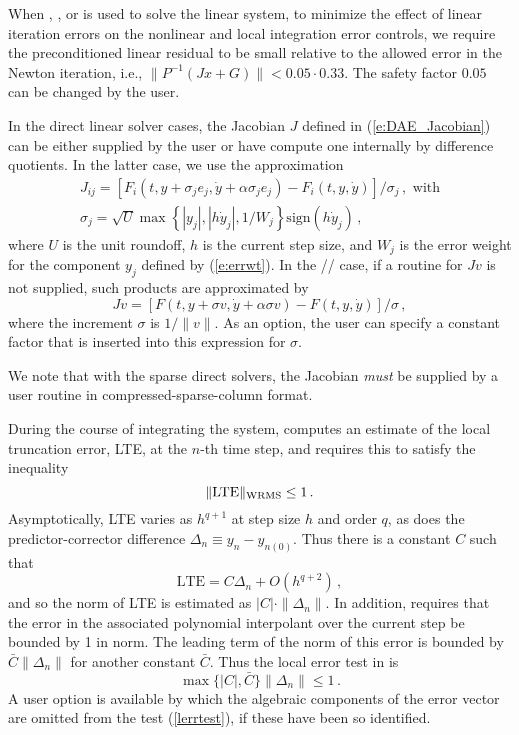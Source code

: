 When {\spgmr}, {\spbcg}, or {\sptfqmr} is used to solve the linear system, to
minimize the effect of linear iteration errors on the nonlinear and local integration
error controls, we require the preconditioned linear residual to be small relative to
the allowed error in the Newton iteration, i.e., 
$\| P^{-1}(Jx+G) \| < 0.05 \cdot 0.33$.
The safety factor $0.05$ can be changed by the user.

In the direct linear solver 
cases, the Jacobian $J$ defined in (\ref{e:DAE_Jacobian}) 
can be either supplied by the user or have {\idas} compute one internally 
by difference quotients. In the latter case, we use the approximation
\begin{gather*}
  J_{ij} = [F_i(t,y+\sigma_j e_j, \dot y + \alpha\sigma_j e_j) - 
            F_i(t,y, \dot y)]/\sigma_j \, , \text{ with}\\
  \sigma_j = \sqrt{U} \max \left\{ |y_j|, |h \dot y_j|,1/W_j \right\}
             \mbox{sign}(h \dot y_j) \, ,
\end{gather*}
where $U$ is the unit roundoff, $h$ is the current step size, and $W_j$ is 
the error weight for the component $y_j$ defined by (\ref{e:errwt}).
In the {\spgmr}/{\spbcg}/{\sptfqmr} case, if a routine for $Jv$ is not
supplied, such products are approximated by
\begin{equation*}
Jv = [F(t,y+\sigma v, \dot y +\alpha\sigma v) - F(t,y, \dot y)]/\sigma \, ,
\end{equation*}
where the increment $\sigma$ is $1/\|v\|$.  As an option, the user can
specify a constant factor that is inserted into this expression for $\sigma$.

We note that with the sparse direct solvers, the Jacobian {\em must}
be supplied by a user routine in compressed-sparse-column format.


During the course of integrating the system, {\idas} computes an estimate
of the local truncation error, LTE, at the $n$-th time step, and
requires this to satisfy the inequality
\begin{equation*}
  \| \mbox{LTE} \|_{\mbox{\scriptsize WRMS}} \leq 1 \, .               
\end{equation*}
Asymptotically, LTE varies as $h^{q+1}$ at step size $h$ and order $q$, as
does the predictor-corrector difference $\Delta_n \equiv y_n-y_{n(0)}$.  
Thus there is a constant $C$ such that
\[ \mbox{LTE} = C \Delta_n + O(h^{q+2}) \, , \]
and so the norm of LTE is estimated as $|C| \cdot \|\Delta_n\|$.
In addition, {\idas} requires that the error in the associated polynomial
interpolant over the current step be bounded by 1 in norm.  The
leading term of the norm of this error is bounded by
$\bar{C} \|\Delta_n\|$ for another constant $\bar{C}$.  Thus the local
error test in {\idas} is
\begin{equation}\label{lerrtest}
   \max\{ |C|, \bar{C} \} \|\Delta_n\| \leq 1 \, .
\end{equation}
A user option is available by which the algebraic components of the
error vector are omitted from the test (\ref{lerrtest}), if these have
been so identified.

